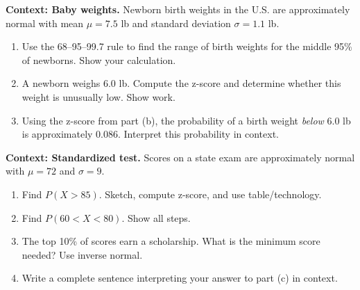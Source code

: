 \documentclass[10pt]{article}
\begin{document}
\namepartnerperiod

\vspace{0.15in}

\begin{tcolorbox}[colback=redbg, colframe=black!40, boxrule=0.6pt, arc=2mm,
    left=3mm, right=3mm, top=2mm, bottom=2mm, title=\textbf{Tier R --- Remediate}]
\textbf{Context: Baby weights.} Newborn birth weights in the U.S. are approximately
normal with mean $\mu = 7.5$ lb and standard deviation $\sigma = 1.1$ lb.

\begin{enumerate}
  \item Use the 68--95--99.7 rule to find the range of birth weights for the middle
        95\% of newborns. Show your calculation.
  \item A newborn weighs 6.0 lb. Compute the z-score and determine whether this weight
        is unusually low. Show work.
  \item Using the z-score from part (b), the probability of a birth weight \emph{below}
        6.0 lb is approximately 0.086. Interpret this probability in context.
\end{enumerate}
\end{tcolorbox}

\vspace{0.1in}

\begin{tcolorbox}[colback=redbg, colframe=black!40, boxrule=0.6pt, arc=2mm,
    left=3mm, right=3mm, top=2mm, bottom=2mm, title=\textbf{Tier A --- Approaching Proficiency}]
\textbf{Context: Standardized test.} Scores on a state exam are approximately normal
with $\mu = 72$ and $\sigma = 9$.

\begin{enumerate}
  \item Find $P(X > 85)$. Sketch, compute z-score, and use table/technology.
        \vspace{1.1in}
  \item Find $P(60 < X < 80)$. Show all steps.
        \vspace{1.1in}
  \item The top 10\% of scores earn a scholarship. What is the minimum score needed?
        Use inverse normal.
        \vspace{0.9in}
  \item Write a complete sentence interpreting your answer to part (c) in context.
\end{enumerate}
\end{tcolorbox}
\end{document}
